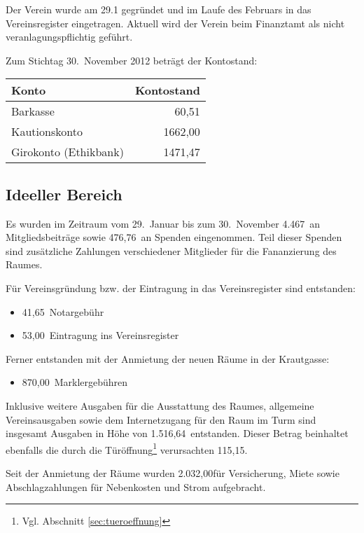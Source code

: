 \documentclass[10pt,DIV16]{scrartcl}
\begin{document}
Der Verein wurde am 29.1 gegründet und im Laufe des Februars in das 
Vereinsregister eingetragen. Aktuell wird der Verein beim Finanztamt 
als nicht veranlagungspflichtig geführt.

Zum Stichtag 30.~November 2012 beträgt der Kontostand:

\begin{table}[h!]
	\centering
	\begin{tabular}{l|r}
		\textbf{Konto} & \textbf{Kontostand}  \\ \hline
		Barkasse & 60,51\EUR\\
		Kautionskonto & 1662,00\EUR\\
		Girokonto (Ethikbank) & 1471,47\EUR\\
	\end{tabular}
\end{table}

\subsection{Ideeller Bereich} 

Es wurden im Zeitraum vom 29.~Januar bis zum 30.~November 4.467\EUR\ 
an Mitgliedsbeiträge sowie 476,76\EUR\ an Spenden eingenommen. Teil 
dieser Spenden sind zusätzliche Zahlungen verschiedener Mitglieder 
für die Fananzierung des Raumes. 

Für Vereinsgründung bzw. der Eintragung in das Vereinsregister sind 
entstanden: 

\begin{itemize}
	\item 41,65\EUR\ Notargebühr
	\item 53,00\EUR\ Eintragung ins Vereinsregister
\end{itemize}

\noindent{} Ferner entstanden mit der Anmietung der neuen Räume in 
der Krautgasse:

\begin{itemize}
	\item 870,00\EUR\ Marklergebühren
\end{itemize}

Inklusive weitere Ausgaben für die Ausstattung des Raumes, 
allgemeine Vereinsausgaben sowie dem Internetzugang für den Raum im 
Turm sind insgesamt Ausgaben in Höhe von 1.516,64\EUR\ entstanden. 
Dieser Betrag beinhaltet ebenfalls die durch die Türöffnung\footnote
{Vgl. Abschnitt \ref{sec:tueroeffnung}} verursachten 115,15\EUR.

Seit der Anmietung der Räume wurden 2.032,00\EUR für Versicherung, 
Miete sowie Abschlagzahlungen für Nebenkosten und Strom aufgebracht. 
\end{document}
